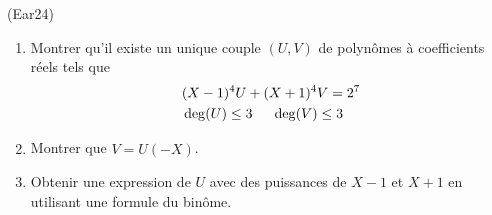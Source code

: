 \begin{tiny}(Ear24)\end{tiny}
\begin{enumerate}
 \item  Montrer qu'il existe un unique couple $(U,V)$ de polynômes à coefficients réels tels que
\begin{align*}
 &(X-1)^4 U + (X+1)^4V = 2^7 \\
 &\deg(U)\leq 3 \hspace{0.5cm} \deg(V)\leq 3
\end{align*}
\item Montrer que $V =\widehat{U}(-X)$.
\item Obtenir une expression de $U$ avec des puissances de $X-1$ et $X+1$ en utilisant une formule du binôme. 
\end{enumerate}